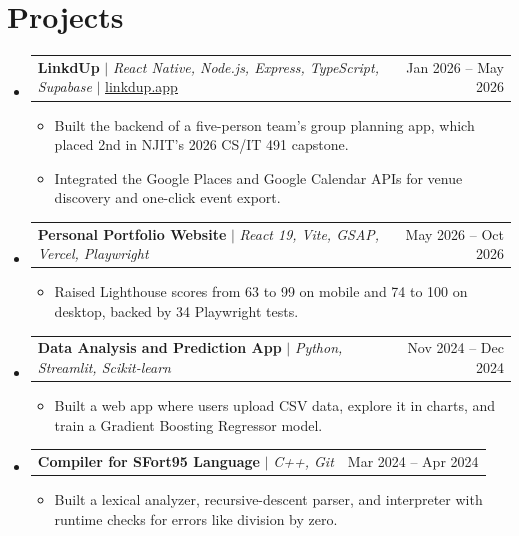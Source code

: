 \documentclass[letterpaper,11pt]{article}
\makeatletter
\newcommand{\resumeItem}[1]{\item\small{#1}}
\newcommand{\resumeProjectHeading}[2]{
    \item
    \begin{tabular*}{0.97\textwidth}{l@{\extracolsep{\fill}}r}
      \small#1 & #2 \\
    \end{tabular*}\vspace{-7pt}
}
\newcommand{\resumeSubHeadingListStart}{\begin{itemize}[leftmargin=0.15in, label={}, itemsep=1pt, parsep=0pt, topsep=2pt]}
\newcommand{\resumeSubHeadingListEnd}{\end{itemize}}
\newcommand{\resumeItemListStart}{\begin{itemize}[topsep=6pt,itemsep=0pt,parsep=0pt,partopsep=0pt]}
\newcommand{\resumeItemListEnd}{\end{itemize}\vspace{-5pt}}
\makeatother
\begin{document}
\section{Projects}
    \resumeSubHeadingListStart
      \resumeProjectHeading
          {\textbf{LinkdUp} $|$ \emph{React Native, Node.js, Express, TypeScript, Supabase} $|$ \href{https://linkdup.app}{\underline{linkdup.app}}}{Jan 2026 -- May 2026}
          \resumeItemListStart
            \resumeItem{Built the backend of a five-person team's group planning app, which placed 2nd in NJIT's 2026 CS/IT 491 capstone.}
            \resumeItem{Integrated the Google Places and Google Calendar APIs for venue discovery and one-click event export.}
          \resumeItemListEnd
      \resumeProjectHeading
          {\textbf{Personal Portfolio Website} $|$ \emph{React 19, Vite, GSAP, Vercel, Playwright}}{May 2026 -- Oct 2026}
          \resumeItemListStart
            \resumeItem{Raised Lighthouse scores from 63 to 99 on mobile and 74 to 100 on desktop, backed by 34 Playwright tests.}
          \resumeItemListEnd
      \resumeProjectHeading
          {\textbf{Data Analysis and Prediction App} $|$ \emph{Python, Streamlit, Scikit-learn}}{Nov 2024 -- Dec 2024}
          \resumeItemListStart
            \resumeItem{Built a web app where users upload CSV data, explore it in charts, and train a Gradient Boosting Regressor model.}
          \resumeItemListEnd
      \resumeProjectHeading
          {\textbf{Compiler for SFort95 Language} $|$ \emph{C++, Git}}{Mar 2024 -- Apr 2024}
          \resumeItemListStart
            \resumeItem{Built a lexical analyzer, recursive-descent parser, and interpreter with runtime checks for errors like division by zero.}
          \resumeItemListEnd
    \resumeSubHeadingListEnd
\end{document}
